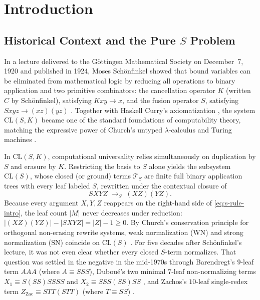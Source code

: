 \documentclass[11pt,reqno]{amsart}
\numberwithin{equation}{section}
\theoremstyle{plain}
\theoremstyle{definition}
\theoremstyle{remark}
\newcommand{\CLS}{\mathrm{CL}(S)}
\newcommand{\TS}{\mathcal{T}_S}
\newcommand{\SN}{\mathrm{SN}}
\newcommand{\WN}{\mathrm{WN}}
\newcommand{\redS}{\to_S}
\begin{document}
\section{Introduction}\label{sec:intro}

\subsection{Historical Context and the Pure \texorpdfstring{$S$}{S} Problem}\label{subsec:intro-history}

In a lecture delivered to the G\"ottingen Mathematical Society on December~7, 1920 and published in 1924, Moses Sch\"onfinkel showed that bound variables can be eliminated from mathematical logic by reducing all operations to binary application and two primitive combinators: the cancellation operator $K$ (written $C$ by Sch\"onfinkel), satisfying $K x y \to x$, and the fusion operator $S$, satisfying $S x y z \to (x z)(y z)$ \cite{Schonfinkel1924}. Together with Haskell Curry's axiomatization \cite{Curry1930,CurryFeys1958}, the system $\mathrm{CL}(S,K)$ became one of the standard foundations of computability theory, matching the expressive power of Church's untyped $\lambda$-calculus and Turing machines \cite{Turing1937Computable,Barendregt1984,HindleySeldin2008}.

In $\mathrm{CL}(S,K)$, computational universality relies simultaneously on duplication by $S$ and erasure by $K$. Restricting the basis to $S$ alone yields the subsystem $\CLS$, whose closed (or ground) terms $\TS$ are finite full binary application trees with every leaf labeled $S$, rewritten under the contextual closure of
\begin{equation}\label{eq:s-rule-intro}
  S X Y Z \;\redS\; (X Z)(Y Z).
\end{equation}
Because every argument $X, Y, Z$ reappears on the right-hand side of \eqref{eq:s-rule-intro}, the leaf count $|M|$ never decreases under reduction: $|(X Z)(Y Z)| - |S X Y Z| = |Z| - 1 \ge 0$. By Church's conservation principle for orthogonal non-erasing rewrite systems, weak normalization ($\WN$) and strong normalization ($\SN$) coincide on $\CLS$ \cite{Church1941,Zachos1978,BarendregtEndrullisKlopWaldmann2017}. For five decades after Sch\"onfinkel's lecture, it was not even clear whether every closed $S$-term normalizes. That question was settled in the negative in the mid-1970s through Barendregt's $9$-leaf term $A A A$ (where $A \equiv S S S$), Dubou\'e's two minimal $7$-leaf non-normalizing terms $X_1 \equiv S(S S)S S S S$ and $X_2 \equiv S S S(S S)S S$ \cite{BarendregtBergstraKlopVolken1976,Barendregt1984}, and Zachos's $10$-leaf single-redex term $Z_{\mathrm{Zac}} \equiv S T T(S T T)$ (where $T \equiv S S$) \cite{Zachos1978}.
\end{document}
